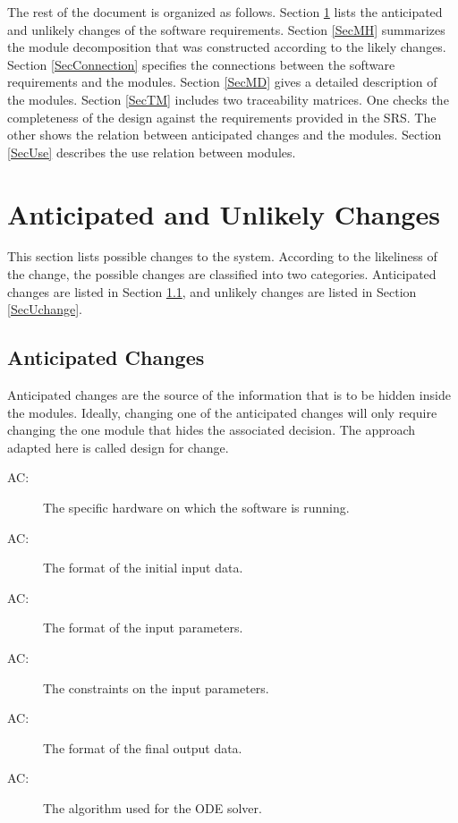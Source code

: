 \documentclass[12pt, titlepage]{article}
\newcounter{acnum}
\newcommand{\actheacnum}{AC\theacnum}
\begin{document}
The rest of the document is organized as follows. Section
\ref{SecChange} lists the anticipated and unlikely changes of the software
requirements. Section \ref{SecMH} summarizes the module decomposition that
was constructed according to the likely changes. Section \ref{SecConnection}
specifies the connections between the software requirements and the
modules. Section \ref{SecMD} gives a detailed description of the
modules. Section \ref{SecTM} includes two traceability matrices. One checks
the completeness of the design against the requirements provided in the SRS. The
other shows the relation between anticipated changes and the modules. Section
\ref{SecUse} describes the use relation between modules.

\section{Anticipated and Unlikely Changes} \label{SecChange}

This section lists possible changes to the system. According to the likeliness
of the change, the possible changes are classified into two
categories. Anticipated changes are listed in Section \ref{SecAchange}, and
unlikely changes are listed in Section \ref{SecUchange}.

\subsection{Anticipated Changes} \label{SecAchange}

Anticipated changes are the source of the information that is to be hidden
inside the modules. Ideally, changing one of the anticipated changes will only
require changing the one module that hides the associated decision. The approach
adapted here is called design for
change.

\begin{description}
\item[ \actheacnum \label{acHardware}:] The specific
  hardware on which the software is running.
\item[ \actheacnum \label{acInput}:] The format of the
  initial input data.
\item[ \actheacnum \label{acInputParam}:] The format of
  the input parameters.
\item[ \actheacnum \label{acConstraints}:] The constraints
  on the input parameters.
\item[ \actheacnum \label{acOutput}:] The format of the
  final output data.
\item[ \actheacnum \label{acODE}:] The algorithm used for
  the ODE solver.
\end{description}
\end{document}

